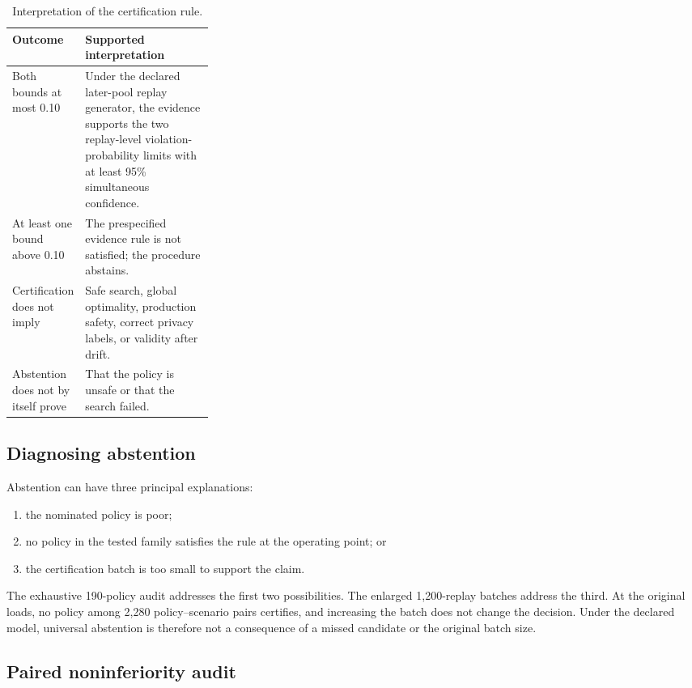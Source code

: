 \documentclass[futureinternet,supfile,submit,moreauthors]{Definitions/mdpi}
\begin{document}
\begin{table}[h]
\centering
\small
\caption{Interpretation of the certification rule.}
\label{tab:certification-meaning}
\begin{tabularx}{\linewidth}{>{\raggedright\arraybackslash}p{0.29\linewidth}
>{\raggedright\arraybackslash}X}
\toprule
Outcome & Supported interpretation\\
\midrule
Both bounds at most 0.10 & Under the declared later-pool replay generator, the evidence supports the two replay-level violation-probability limits with at least 95\% simultaneous confidence.\\
At least one bound above 0.10 & The prespecified evidence rule is not satisfied; the procedure abstains.\\
Certification does not imply & Safe search, global optimality, production safety, correct privacy labels, or validity after drift.\\
Abstention does not by itself prove & That the policy is unsafe or that the search failed.\\
\bottomrule
\end{tabularx}
\end{table}

\subsection{Diagnosing abstention}

Abstention can have three principal explanations:

\begin{enumerate}
\item the nominated policy is poor;
\item no policy in the tested family satisfies the rule at the operating point; or
\item the certification batch is too small to support the claim.
\end{enumerate}

The exhaustive 190-policy audit addresses the first two possibilities. The
enlarged 1,200-replay batches address the third. At the original loads, no
policy among 2,280 policy--scenario pairs certifies, and increasing the batch
does not change the decision. Under the declared model, universal abstention
is therefore not a consequence of a missed candidate or the original batch
size.

\subsection{Paired noninferiority audit}
\end{document}
